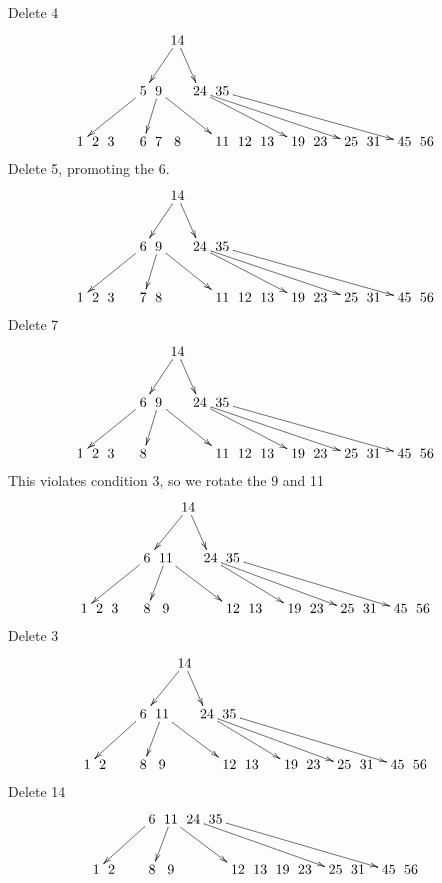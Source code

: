\documentclass[a4paper]{article}
\begin{document}
Delete 4
$$\xymatrix @C=0pt {
& & & &  & & & \ar[dll] 14 \ar[dr] & &   &  &  \\
& & & &  & \ar[dlllll] 5 & \ar[dl] 9 \ar[drrr] &  & \ar[drrrrr] 24\ar[drrrrrrrr] & 35 \ar[drrrrrrrrrr]  &  &  \\
 1 & 2 & 3 &  &  & 6 & 7 & 8 &  & 11 & 12 & 13 &  & 19 & 23 &   & 25 & 31 &  & 45 & 56 &  \\
}$$
Delete 5, promoting the 6.
$$\xymatrix @C=0pt {
& & & &  & & & \ar[dll] 14 \ar[dr] & &   &  &  \\
& & & &  & \ar[dlllll] 6 & \ar[dl] 9 \ar[drrr] &  & \ar[drrrrr] 24\ar[drrrrrrrr] & 35 \ar[drrrrrrrrrr]  &  &  \\
 1 & 2 & 3 &  &  & 7 & 8 &  &  & 11 & 12 & 13 &  & 19 & 23 &   & 25 & 31 &  & 45 & 56 &  \\
}$$
Delete 7
$$\xymatrix @C=0pt {
& & & &  & & & \ar[dll] 14 \ar[dr] & &   &  &  \\
& & & &  & \ar[dlllll] 6 & \ar[dl] 9 \ar[drrr] &  & \ar[drrrrr] 24\ar[drrrrrrrr] & 35 \ar[drrrrrrrrrr]  &  &  \\
 1 & 2 & 3 &  &  & 8 &  &  &  & 11 & 12 & 13 &  & 19 & 23 &   & 25 & 31 &  & 45 & 56 &  \\
}$$
This violates condition 3, so we rotate the 9 and 11
$$\xymatrix @C=0pt {
& & & &  & & & \ar[dll] 14 \ar[dr] & &   &  &  \\
& & & &  & \ar[dlllll] 6 & \ar[dl] 11 \ar[drrr] &  & \ar[drrrrr] 24\ar[drrrrrrrr] & 35 \ar[drrrrrrrrrr]  &  &  \\
 1 & 2 & 3 &  &  & 8 & 9 &  &  & 12 & 13 &  &  & 19 & 23 &   & 25 & 31 &  & 45 & 56 &  \\
}$$
Delete 3
$$\xymatrix @C=0pt {
& & & &  & & & \ar[dll] 14 \ar[dr] & &   &  &  \\
& & & &  & \ar[dlllll] 6 & \ar[dl] 11 \ar[drrr] &  & \ar[drrrrr] 24\ar[drrrrrrrr] & 35 \ar[drrrrrrrrrr]  &  &  \\
 1 & 2 &  &  &  & 8 & 9 &  &  & 12 & 13 &  &  & 19 & 23 &   & 25 & 31 &  & 45 & 56 &  \\
}$$
Delete 14
$$\xymatrix @C=0pt {
& & & &  & \ar[dlllll] 6 & \ar[dl] 11 \ar[drrr] &  24 \ar[drrrrrrr] & 35 \ar[drrrrrrrrr]  &  &  \\
 1 & 2 &  &  &  & 8 & 9 &  &  & 12 & 13 & 19 & 23 &   & 25 & 31 &  & 45 & 56 &  \\
}$$
\end{document}
